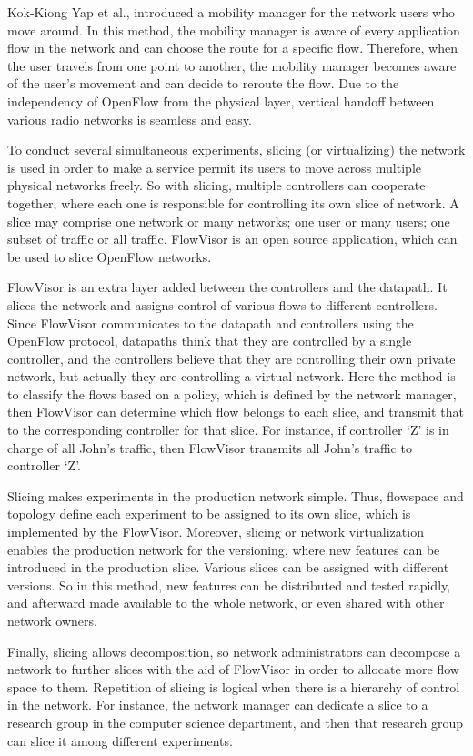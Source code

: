 Kok-Kiong Yap et al., introduced a mobility manager for the network users who move around. In this method, the mobility manager is aware of every application flow in the network and can choose the route for a specific flow. Therefore, when the user travels from one point to another, the mobility manager becomes aware of the user’s movement and can decide to reroute the flow. Due to the independency of OpenFlow from the physical layer, vertical handoff between various radio networks is seamless and easy. 

To conduct several simultaneous experiments, slicing (or virtualizing) the network is used in order to make a service permit its users to move across multiple physical networks freely. So with slicing, multiple controllers can cooperate together, where each one is responsible for controlling its own slice of network. A slice may comprise one network or many networks; one user or many users; one subset of traffic or all traffic. FlowVisor is an open source application, which can be used to slice OpenFlow networks. 

FlowVisor is an extra layer added between the controllers and the datapath. It slices the network and assigns control of various flows to different controllers. Since FlowVisor communicates to the datapath and controllers using the OpenFlow protocol, datapaths think that they are controlled by a single controller, and the controllers believe that they are controlling their own private network, but actually they are controlling a virtual network. Here the method is to classify the flows based on a policy, which is defined by the network manager, then FlowVisor can determine which flow belongs to each slice, and transmit that to the corresponding controller for that slice. For instance, if controller ‘Z’ is in charge of all John’s traffic, then FlowVisor transmits all John’s traffic to controller ‘Z’. 

Slicing makes experiments in the production network simple. Thus, flowspace and topology define each experiment to be assigned to its own slice, which is implemented by the FlowVisor. Moreover, slicing or network virtualization enables the production network for the versioning, where new features can be introduced in the production slice. Various slices can be assigned with different versions. So in this method, new features can be distributed and tested rapidly, and afterward made available to the whole network, or even shared with other network owners. 

Finally, slicing allows decomposition, so network administrators can decompose a network to further slices with the aid of FlowVisor in order to allocate more flow space to them. Repetition of slicing is logical when there is a hierarchy of control in the network. For instance, the network manager can dedicate a slice to a research group in the computer science department, and then that research group can slice it among different experiments. 

